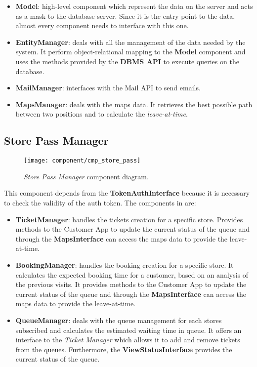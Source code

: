 \begin{itemize}
	\item \textbf{Model}: high-level component which represent the data on the server and acts as a mask to the database server. Since it is the entry point to the data, almost every component needs to interface with this one.
	
	\item \textbf{EntityManager}: deals with all the management of the data needed by the system. It perform object-relational mapping to the \textbf{Model} component and uses the methods provided by the \textbf{DBMS API} to execute queries on the database.
	
	\item \textbf{MailManager}: interfaces with the Mail API to send emails.	
	
	\item \textbf{MapsManager}: deals with the maps data. It retrieves the best possible path between two positions and to calculate the \textit{leave-at-time}.
\end{itemize}

\clearpage

\subsection{Store Pass Manager}

\begin{figure}[H]
	\centering
	\texttt{[image: component/cmp\_store\_pass]}
	\caption{\textit{Store Pass Manager} component diagram.}
	\label{fig:cmp_store_pass}
\end{figure}

This component depends from the \textbf{TokenAuthInterface} because it is necessary to check the validity of the auth token. The components in  are:
\begin{itemize}
	\item \textbf{TicketManager}: handles the tickets creation for a specific store. Provides methods to the Customer App to update the current status of the queue and through the \textbf{MapsInterface} can access the maps data to provide the leave-at-time.
	
	\item \textbf{BookingManager}: handles the booking creation for a specific store. It calculates the expected booking time for a customer, based on an analysis of the previous visits. It provides methods to the Customer App to update the current status of the queue and through the \textbf{MapsInterface} can access the maps data to provide the leave-at-time.
	
	\item \textbf{QueueManager}: deals with the queue management for each stores subscribed and calculates the estimated waiting time in queue. It offers an interface to the \textit{Ticket Manager} which allows it to add and remove tickets from the queues. Furthermore, the \textbf{ViewStatusInterface} provides the current status of the queue.
\end{itemize}


